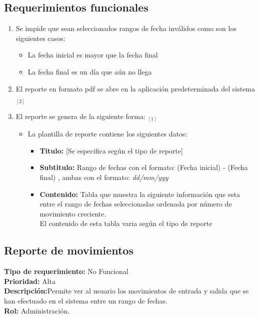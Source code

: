 \documentclass[a4paper,DIV=12]{scrreprt}
\begin{document}
\subsection*{Requerimientos funcionales}
\begin{enumerate}
	\item{Se impide que sean seleccionados rangos de fecha inválidos como son los siguientes casos:}
	\begin{itemize}
		\item{La fecha inicial es mayor que la fecha final}
		\item{La fecha final es un día que aún no llega}
	\end{itemize}	
	\item{El reporte en formato pdf se abre en la aplicación predeterminada del sistema $_{[2]}$}
	
	\item{El reporte se genera de la siguiente forma: $_{[1]}$}	
	\begin{itemize}
	 	\item{La plantilla de reporte contiene los siguientes datos:}
	 	\begin{itemize}
	 		\item{\textbf{Titulo:} [Se especifica según el tipo de reporte]}
	 		\item{\textbf{Subtitulo:} Rango de fechas con el formato: (Fecha inicial) - (Fecha final) , ambas con el formato: \textit{dd/mm/yyy} }
	 		\item{\textbf{Contenido:} Tabla que muestra la siguiente información que esta entre el rango de fechas seleccionadas ordenada por número de movimiento creciente.\\ El contenido de esta tabla varia según el tipo de reporte}		

	 	\end{itemize}
	\end{itemize}
	
\end{enumerate}

\newpage
\setcounter{section}{1}
\setcounter{subsection}{-1}
\subsection{Reporte de movimientos}
\noindent
\textbf{Tipo de requerimiento:} No Funcional \\
\textbf{Prioridad:} Alta\\
\textbf{Descripción:}Permite ver al usuario los movimientos de entrada y salida que se han efectuado en el sistema entre un rango de fechas.\\
\textbf{Rol:} Administración.
\end{document}
